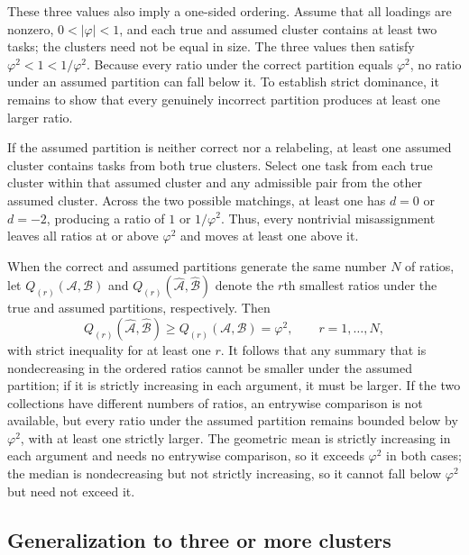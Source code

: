 \documentclass[
  american,
  man,floatsintext]{apa7}
\begin{document}
These three values also imply a one-sided ordering. Assume that all loadings are nonzero, \(0<|\varphi|<1\), and each true and assumed cluster contains at least two tasks; the clusters need not be equal in size. The three values then satisfy \(\varphi^2<1<1/\varphi^2\). Because every ratio under the correct partition equals \(\varphi^2\), no ratio under an assumed partition can fall below it. To establish strict dominance, it remains to show that every genuinely incorrect partition produces at least one larger ratio.

If the assumed partition is neither correct nor a relabeling, at least one assumed cluster contains tasks from both true clusters. Select one task from each true cluster within that assumed cluster and any admissible pair from the other assumed cluster. Across the two possible matchings, at least one has \(d=0\) or \(d=-2\), producing a ratio of \(1\) or \(1/\varphi^2\). Thus, every nontrivial misassignment leaves all ratios at or above \(\varphi^2\) and moves at least one above it.

When the correct and assumed partitions generate the same number \(N\) of ratios, let \(Q_{(r)}(\mathcal A,\mathcal B)\) and \(Q_{(r)}(\widehat{\mathcal A},\widehat{\mathcal B})\) denote the \(r\)th smallest ratios under the true and assumed partitions, respectively. Then
\[
Q_{(r)}(\widehat{\mathcal A},\widehat{\mathcal B})
\geq
Q_{(r)}(\mathcal A,\mathcal B)
=
\varphi^2,
\qquad r=1,\ldots,N,
\]
with strict inequality for at least one \(r\). It follows that any summary that is nondecreasing in the ordered ratios cannot be smaller under the assumed partition; if it is strictly increasing in each argument, it must be larger. If the two collections have different numbers of ratios, an entrywise comparison is not available, but every ratio under the assumed partition remains bounded below by \(\varphi^2\), with at least one strictly larger. The geometric mean is strictly increasing in each argument and needs no entrywise comparison, so it exceeds \(\varphi^2\) in both cases; the median is nondecreasing but not strictly increasing, so it cannot fall below \(\varphi^2\) but need not exceed it.

\subsection{Generalization to three or more clusters}\label{generalization-to-three-or-more-clusters}
\end{document}
